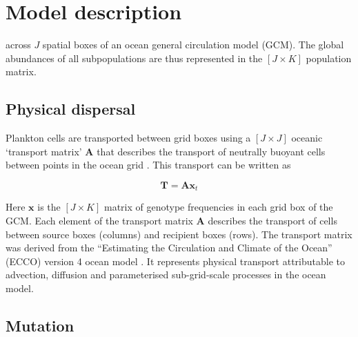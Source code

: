 \documentclass[12pt]{article}
\begin{document}
\begin{figure}[htp!]
\begin{subfigure}{0.5\textwidth}
\end{subfigure}
\begin{subfigure}{0.5\textwidth}
\end{subfigure}
\caption{}
\label{Schematic}
\end{figure}



\section{Model description}





across $J$ spatial boxes of an ocean general circulation model (GCM). The global abundances of all subpopulations are thus represented in the $[J\times K]$ population matrix.



\subsection*{Physical dispersal}

Plankton cells are transported between grid boxes using a $[J\times J]$ oceanic `transport matrix' $\mathbf{A}$ that describes the transport of neutrally buoyant cells between points in the ocean grid \citep{Khatiwala:2005}. This transport can be written as 

\begin{equation}
\label{ }
\mathbf{T} = \mathbf{A}\mathbf{x}_{t}
\end{equation}

Here $\mathbf{x}$ is the $[J\times K]$ matrix of genotype frequencies in each grid box of the GCM. Each element of the transport matrix $\mathbf{A}$ describes the transport of cells between source boxes (columns) and recipient boxes (rows). The transport matrix was derived from the ``Estimating the Circulation and Climate of the Ocean'' (ECCO) version 4 ocean model \citep{}. It represents physical transport attributable to advection, diffusion and parameterised sub-grid-scale processes in the ocean model. 

\subsection*{Mutation}
\end{document}
